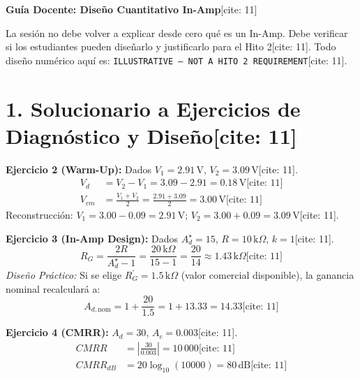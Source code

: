 \documentclass[11pt, a4paper]{article}
\begin{document}
\begin{center}
    \Large\textbf{\textcolor{ucbblue}{Guía Docente: Diseño Cuantitativo In-Amp}}[cite: 11]
\end{center}

\begin{tcolorbox}[colback=yellow!5, colframe=ucbblue, title=\textbf{Nota Pedagógica}]
    \raggedright
    La sesión no debe volver a explicar desde cero qué es un In-Amp. Debe verificar si los estudiantes pueden diseñarlo y justificarlo para el Hito 2[cite: 11]. Todo diseño numérico aquí es: \texttt{ILLUSTRATIVE — NOT A HITO 2 REQUIREMENT}[cite: 11].
\end{tcolorbox}

\section*{1. Solucionario a Ejercicios de Diagnóstico y Diseño[cite: 11]}

\textbf{Ejercicio 2 (Warm-Up):} Dados $V_1=2.91\,\text{V}$, $V_2=3.09\,\text{V}$[cite: 11].
\begin{align*}
    V_d &= V_2 - V_1 = 3.09 - 2.91 = \boxed{0.18\,\text{V}} \text{[cite: 11]} \\
    V_{cm} &= \frac{V_1+V_2}{2} = \frac{2.91 + 3.09}{2} = \boxed{3.00\,\text{V}} \text{[cite: 11]}
\end{align*}
Reconstrucción: $V_1 = 3.00 - 0.09 = 2.91\,\text{V}$; $V_2 = 3.00 + 0.09 = 3.09\,\text{V}$[cite: 11].

\textbf{Ejercicio 3 (In-Amp Design):} Dados $A_d^\star=15$, $R=10\,\text{k}\Omega$, $k=1$[cite: 11].
\begin{equation*}
    R_G = \frac{2R}{A_d^\star - 1} = \frac{20\,\text{k}\Omega}{15 - 1} = \frac{20}{14} \approx \boxed{1.43\,\text{k}\Omega} \text{[cite: 11]}
\end{equation*}
\textit{Diseño Práctico:} Si se elige $R_G^\prime = 1.5\,\text{k}\Omega$ (valor comercial disponible), la ganancia nominal recalculará a:
\begin{equation*}
    A_{d,\mathrm{nom}} = 1 + \frac{20}{1.5} = 1 + 13.33 = \boxed{14.33} \text{[cite: 11]}
\end{equation*}

\textbf{Ejercicio 4 (CMRR):} $A_d=30$, $A_c=0.003$[cite: 11].
\begin{align*}
    CMRR &= \left|\frac{30}{0.003}\right| = \boxed{10\,000} \text{[cite: 11]} \\
    CMRR_{dB} &= 20\log_{10}(10000) = \boxed{80\,\text{dB}} \text{[cite: 11]}
\end{align*}
\end{document}
